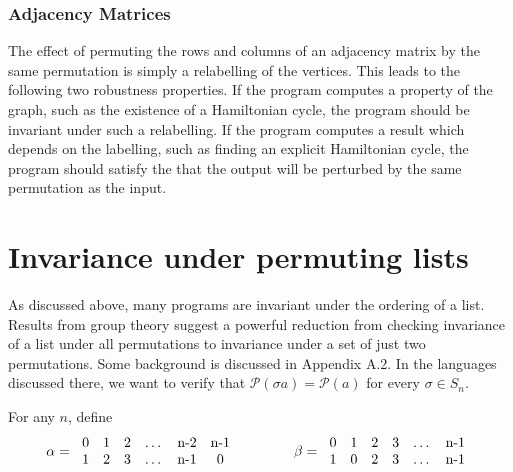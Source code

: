 \documentclass{llncs}
\begin{document}
    \subsubsection{Adjacency Matrices}

      The effect of permuting the rows and columns of an adjacency matrix by the same
      permutation is simply a relabelling of the vertices.  This leads to the following
      two robustness properties.  If the program computes a
      property of the graph, such as the existence of a Hamiltonian cycle, the program
      should be invariant under such a relabelling.  If the program computes a result
      which depends on the labelling, such as finding an explicit Hamiltonian cycle,
      the program should satisfy the that
      the output will be perturbed by the same permutation as the input.


\section{Invariance under permuting lists}
\label{permlists}

  As discussed above, many programs are invariant under the ordering of a list.
  Results from group theory  suggest a powerful 
  reduction from checking invariance of a list under all permutations
  to invariance under a set of just two permutations.
  Some background is discussed in Appendix A.2.
  In the languages discussed there, we want to verify that
  $\mathcal{P}(\sigma a) = \mathcal{P}(a)$ for every $\sigma\in S_n$.

  For any $n$, define
  \[
    \alpha = 
      \begin{tabular}{c@{\hspace{1em}}c@{\hspace{1em}}c@{\hspace{1em}}c@{\hspace{1em}}c@{\hspace{1em}}c}
      0 & 1 & 2 & \ldots & n-2 & n-1\\
      1 & 2 & 3 & \ldots & n-1 & 0
      \end{tabular}
    \qquad \qquad
    \beta = 
      \begin{tabular}{c@{\hspace{1em}}c@{\hspace{1em}}c@{\hspace{1em}}c@{\hspace{1em}}c@{\hspace{1em}}c}
      0 & 1 & 2 & 3 & \ldots & n-1\\
      1 & 0 & 2 & 3 & \ldots & n-1
      \end{tabular}
  \]
\end{document}
